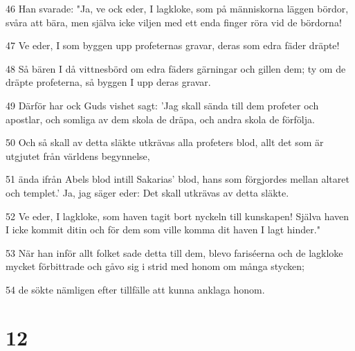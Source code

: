 \par 46 Han svarade: "Ja, ve ock eder, I lagkloke, som på människorna läggen bördor, svåra att bära, men själva icke viljen med ett enda finger röra vid de bördorna!
\par 47 Ve eder, I som byggen upp profeternas gravar, deras som edra fäder dräpte!
\par 48 Så bären I då vittnesbörd om edra fäders gärningar och gillen dem; ty om de dräpte profeterna, så byggen I upp deras gravar.
\par 49 Därför har ock Guds vishet sagt: 'Jag skall sända till dem profeter och apostlar, och somliga av dem skola de dräpa, och andra skola de förfölja.
\par 50 Och så skall av detta släkte utkrävas alla profeters blod, allt det som är utgjutet från världens begynnelse,
\par 51 ända ifrån Abels blod intill Sakarias' blod, hans som förgjordes mellan altaret och templet.' Ja, jag säger eder: Det skall utkrävas av detta släkte.
\par 52 Ve eder, I lagkloke, som haven tagit bort nyckeln till kunskapen! Själva haven I icke kommit ditin och för dem som ville komma dit haven I lagt hinder."
\par 53 När han inför allt folket sade detta till dem, blevo fariséerna och de lagkloke mycket förbittrade och gåvo sig i strid med honom om många stycken;
\par 54 de sökte nämligen efter tillfälle att kunna anklaga honom.

\chapter{12}

